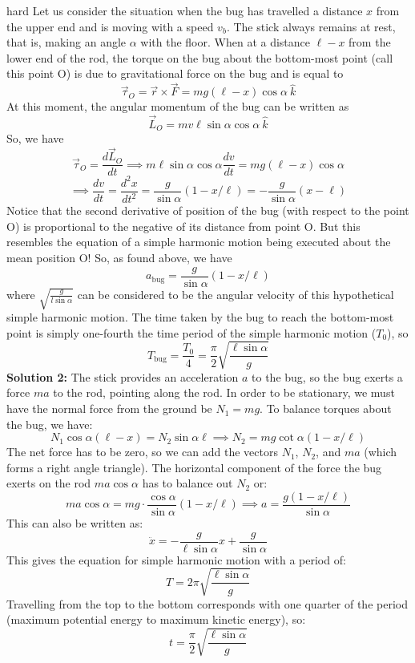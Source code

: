 \begin{solution}{hard}
Let us consider the situation when the bug has travelled a distance $x$ from the upper end and is moving with a speed $v_b$. The stick always remains at rest, that is, making an angle $\alpha$ with the floor. When at a distance $\ell-x$ from the lower end of the rod, the torque on the bug about the bottom-most point (call this point O) is due to gravitational force on the bug and is equal to $$\vec{\tau}_O = \vec{r} \times \vec{F} = mg (\ell - x) \cos{\alpha} \ \hat{k}$$ At this moment, the angular momentum of the bug can be written as $$\vec{L}_O = mv\ell \sin{\alpha} \cos{\alpha} \ \hat{k}$$ So, we have $$\vec{\tau}_O= \frac{d \vec{L}_O}{dt} \implies  m\ell \sin{\alpha} \cos{\alpha} \frac{dv}{dt} = mg (\ell-x) \cos{\alpha}$$ $$\implies \frac{dv}{dt} = \frac{d^2x}{dt^2} = \frac{g}{\sin{\alpha}} (1-x/\ell) = -\frac{g}{\sin{\alpha}} (x-\ell) $$ Notice that the second derivative of position of the bug (with respect to the point O) is proportional to the negative of its distance from point O. But this resembles the equation of a simple harmonic motion being executed about the mean position O! So, as found above, we have $$a_{\text{bug}} = \boxed{ \frac{g}{\sin{\alpha}}(1-x/\ell)}$$ where $\sqrt{\frac{g}{l \sin{\alpha}}}$ can be considered to be the angular velocity of this hypothetical simple harmonic motion. The time taken by the bug to reach the bottom-most point is simply one-fourth the time period of the simple harmonic motion ($T_0$), so $$T_{\text{bug}} = \frac{T_0}{4} = \boxed{ \frac{\pi}{2} \sqrt{\frac{\ell \sin{\alpha}}{g}}}$$
\tcbline
\textbf{Solution 2:} The stick provides an acceleration $a$ to the bug, so the bug exerts a force $ma$ to the rod, pointing along the rod. In order to be stationary, we must have the normal force from the ground be $N_1=mg$. To balance torques about the bug, we have:
$$N_1\cos\alpha (\ell-x) = N_2\sin\alpha\ell \implies N_2 = mg\cot\alpha \left(1-x/\ell\right)$$The net force has to be zero, so we can add the vectors $N_1$, $N_2$, and $ma$ (which forms a right angle triangle). The horizontal component of the force the bug exerts on the rod $ma\cos\alpha$ has to balance out $N_2$ or:
$$ma\cos\alpha = mg\cdot\frac{\cos\alpha}{\sin\alpha}(1-x/\ell) \implies \boxed{a = \frac{g(1-x/\ell)}{\sin\alpha}}$$This can also be written as:
$$\ddot{x}=-\frac{g}{\ell\sin\alpha}x + \frac{g}{\sin\alpha}$$This gives the equation for simple harmonic motion with a period of:
$$T=2\pi\sqrt{\frac{\ell\sin\alpha}{g}}$$Travelling from the top to the bottom corresponds with one quarter of the period (maximum potential energy to maximum kinetic energy), so:
$$\boxed{t=\frac{\pi}{2}\sqrt{\frac{\ell\sin\alpha}{g}}}$$
\end{solution}
